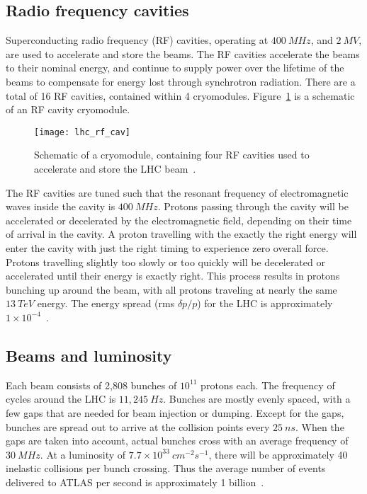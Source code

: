 \subsection{Radio frequency cavities}\label{subsec:lhc_rf}

Superconducting radio frequency (RF) cavities, operating at $400~MHz$, and $2~MV$, are used to accelerate and store the beams.
The RF cavities accelerate the beams to their nominal energy,
and continue to supply power over the lifetime of the beams to compensate for energy lost through synchrotron radiation.
There are a total of 16 RF cavities, contained within 4 cryomodules.
Figure~\ref{fig:rf_cryo} is a schematic of an RF cavity cryomodule.

\begin{figure}[!ht]\centering
\texttt{[image: lhc\_rf\_cav]}
\caption{Schematic of a cryomodule, containing four RF cavities used to accelerate and store the LHC beam~\cite{lhc-machine-2008}.}
\label{fig:rf_cryo}
\end{figure}
The RF cavities are tuned such that the resonant frequency of electromagnetic waves inside the cavity is $400~MHz$.
Protons passing through the cavity will be accelerated or decelerated by the electromagnetic field,
depending on their time of arrival in the cavity.
A proton travelling with the exactly the right energy will enter the cavity with just the right timing to experience zero overall force.
Protons travelling slightly too slowly or too quickly will be decelerated or accelerated until their energy is exactly right.
This process results in protons bunching up around the beam, with all protons traveling at nearly the same $13~TeV$ energy.
The energy spread (rms $\delta p/p$) for the LHC is approximately $1\times 10^{-4}$~\cite{sm-pdg-dark-matter}.

\subsection{Beams and luminosity}\label{subsec:lhc_beam}

Each beam consists of 2,808 bunches of $10^{11}$ protons each.
The frequency of cycles around the LHC is $11,245~Hz$.
Bunches are mostly evenly spaced, with a few gaps that are needed for beam injection or dumping.
Except for the gaps, bunches are spread out to arrive at the collision points every $25~ns$.
When the gaps are taken into account, actual bunches cross with an average frequency of $30~MHz$.
At a luminosity of $7.7\times10^{33}~cm^{-2}s^{-1}$, there will be approximately 40 inelastic collisions per bunch crossing.
Thus the average number of events delivered to ATLAS per second is approximately 1 billion~\cite{lhc-guide-2017}.

